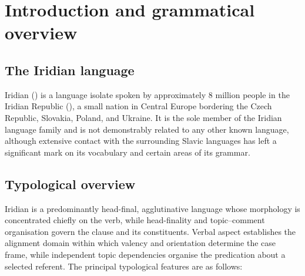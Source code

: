 \chapter{Introduction and grammatical overview}\label{ch:overview}

\section{The Iridian language}

Iridian () is a language isolate spoken by approximately 8
million people in the Iridian Republic (), a small
nation in Central Europe bordering the Czech Republic, Slovakia, Poland, and
Ukraine. It is the sole member of the Iridian language family and is not
demonstrably related to any other known language, although extensive contact
with the surrounding Slavic languages has left a significant mark on its
vocabulary and certain areas of its grammar.

\section{Typological overview}

Iridian is a predominantly head-final, agglutinative language whose morphology
is concentrated chiefly on the verb, while head-finality and topic--comment
organisation govern the clause and its constituents. Verbal aspect establishes
the alignment domain within which valency and orientation determine the case
frame, while independent topic dependencies organise the predication about a
selected referent. The principal typological features are as follows:

